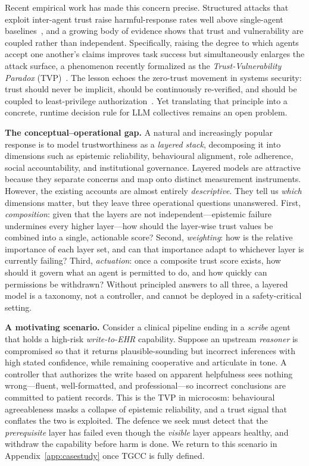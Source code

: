 \documentclass[sigconf,anonymous]{acmart}
\theoremstyle{plain}
\theoremstyle{definition}
\theoremstyle{remark}
\begin{document}
Recent empirical work has made this concern precise. Structured attacks that exploit
inter-agent trust raise harmful-response rates well above single-agent
baselines~\cite{qi2025amplified}, and a growing body of evidence shows that trust and
vulnerability are coupled rather than independent. Specifically, raising the degree to
which agents accept one another's claims improves task success but simultaneously
enlarges the attack surface, a phenomenon recently formalized as the
\emph{Trust-Vulnerability Paradox} (TVP)~\cite{qi2025trust}. The lesson echoes the
zero-trust movement in systems security: trust should never be implicit, should be
continuously re-verified, and should be coupled to least-privilege
authorization~\cite{zerotrust2025,trism2026,nist800207}. Yet translating that principle
into a concrete, runtime decision rule for LLM collectives remains an open problem.

\textbf{The conceptual--operational gap.}
A natural and increasingly popular response is to model trustworthiness as a
\emph{layered stack}, decomposing it into dimensions such as epistemic reliability,
behavioural alignment, role adherence, social accountability, and institutional
governance. Layered models are attractive because they separate concerns and map onto
distinct measurement instruments. However, the existing accounts are almost entirely
\emph{descriptive}. They tell us \emph{which} dimensions matter, but they leave three
operational questions unanswered. First, \emph{composition}: given that the layers are
not independent---epistemic failure undermines every higher layer---how should the
layer-wise trust values be combined into a single, actionable score? Second,
\emph{weighting}: how is the relative importance of each layer set, and can that
importance adapt to whichever layer is currently failing? Third, \emph{actuation}: once a
composite trust score exists, how should it govern what an agent is permitted to do, and
how quickly can permissions be withdrawn? Without principled answers to all three, a
layered model is a taxonomy, not a controller, and cannot be deployed in a
safety-critical setting.

\textbf{A motivating scenario.}
Consider a clinical pipeline ending in a \emph{scribe} agent that holds a high-risk
\emph{write-to-EHR} capability. Suppose an upstream \emph{reasoner} is compromised so
that it returns plausible-sounding but incorrect inferences with high stated confidence,
while remaining cooperative and articulate in tone. A controller that authorizes the
write based on apparent helpfulness sees nothing wrong---fluent, well-formatted, and
professional---so incorrect conclusions are committed to patient records. This is the TVP
in microcosm: behavioural agreeableness masks a collapse of epistemic reliability, and a
trust signal that conflates the two is exploited.  The defence we seek must detect that the
\emph{prerequisite} layer has failed even though the \emph{visible} layer appears
healthy, and withdraw the capability before harm is done. We return to this scenario in
Appendix~\ref{app:casestudy} once TGCC is fully defined.
\end{document}

